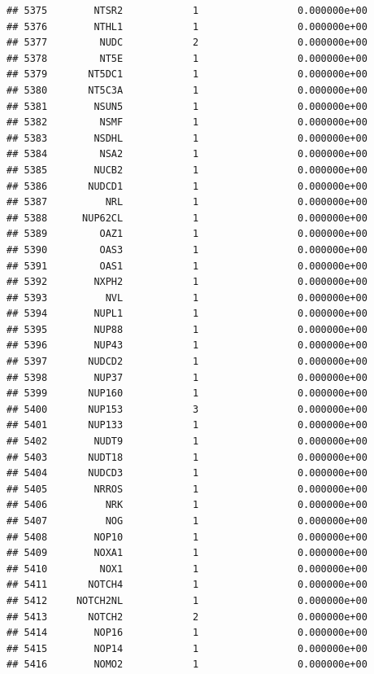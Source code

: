 \documentclass[
]{article}
\begin{document}
\begin{verbatim}
## 5375        NTSR2            1                 0.000000e+00
## 5376        NTHL1            1                 0.000000e+00
## 5377         NUDC            2                 0.000000e+00
## 5378         NT5E            1                 0.000000e+00
## 5379       NT5DC1            1                 0.000000e+00
## 5380       NT5C3A            1                 0.000000e+00
## 5381        NSUN5            1                 0.000000e+00
## 5382         NSMF            1                 0.000000e+00
## 5383        NSDHL            1                 0.000000e+00
## 5384         NSA2            1                 0.000000e+00
## 5385        NUCB2            1                 0.000000e+00
## 5386       NUDCD1            1                 0.000000e+00
## 5387          NRL            1                 0.000000e+00
## 5388      NUP62CL            1                 0.000000e+00
## 5389         OAZ1            1                 0.000000e+00
## 5390         OAS3            1                 0.000000e+00
## 5391         OAS1            1                 0.000000e+00
## 5392        NXPH2            1                 0.000000e+00
## 5393          NVL            1                 0.000000e+00
## 5394        NUPL1            1                 0.000000e+00
## 5395        NUP88            1                 0.000000e+00
## 5396        NUP43            1                 0.000000e+00
## 5397       NUDCD2            1                 0.000000e+00
## 5398        NUP37            1                 0.000000e+00
## 5399       NUP160            1                 0.000000e+00
## 5400       NUP153            3                 0.000000e+00
## 5401       NUP133            1                 0.000000e+00
## 5402        NUDT9            1                 0.000000e+00
## 5403       NUDT18            1                 0.000000e+00
## 5404       NUDCD3            1                 0.000000e+00
## 5405        NRROS            1                 0.000000e+00
## 5406          NRK            1                 0.000000e+00
## 5407          NOG            1                 0.000000e+00
## 5408        NOP10            1                 0.000000e+00
## 5409        NOXA1            1                 0.000000e+00
## 5410         NOX1            1                 0.000000e+00
## 5411       NOTCH4            1                 0.000000e+00
## 5412     NOTCH2NL            1                 0.000000e+00
## 5413       NOTCH2            2                 0.000000e+00
## 5414        NOP16            1                 0.000000e+00
## 5415        NOP14            1                 0.000000e+00
## 5416        NOMO2            1                 0.000000e+00

\end{verbatim}
\end{document}

